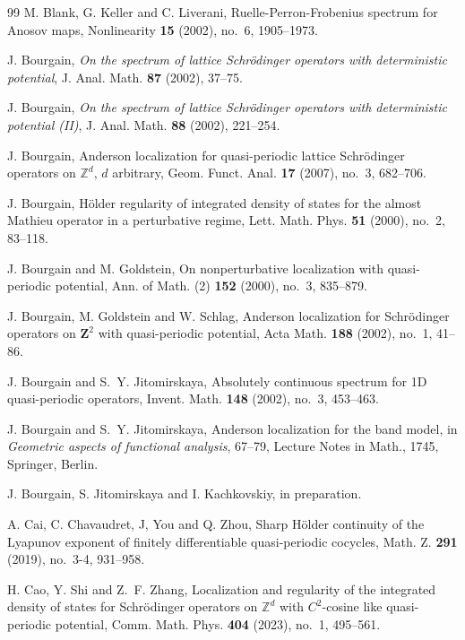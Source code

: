 \documentclass[reqno,11pt]{amsart}
\begin{document}
\begin{thebibliography}{99}
M. Blank, G. Keller and C. Liverani, Ruelle-Perron-Frobenius spectrum for Anosov maps, Nonlinearity {\bf 15} (2002), no.~6, 1905--1973.

J. Bourgain, 
\emph{On the spectrum of lattice Schr\"odinger operators with deterministic potential}, 
J. Anal. Math. \textbf{87} (2002), 37--75.

J. Bourgain, 
\emph{On the spectrum of lattice Schr\"odinger operators with deterministic potential (II)}, 
J. Anal. Math. \textbf{88} (2002), 221--254.

J. Bourgain, Anderson localization for quasi-periodic lattice Schr\"odinger operators on $\mathbb Z^d$, $d$ arbitrary, Geom. Funct. Anal. {\bf 17} (2007), no.~3, 682--706.

J. Bourgain, H\"older regularity of integrated density of states for the almost Mathieu operator in a perturbative regime, Lett. Math. Phys. {\bf 51} (2000), no.~2, 83--118.

J. Bourgain and M. Goldstein, On nonperturbative localization with quasi-periodic potential, Ann. of Math. (2) {\bf 152} (2000), no.~3, 835--879.


J. Bourgain, M. Goldstein and W. Schlag, Anderson localization for Schr\"odinger operators on $\mathbf Z^2$ with quasi-periodic potential, Acta Math. {\bf 188} (2002), no.~1, 41--86.


J. Bourgain and S.~Y. Jitomirskaya, Absolutely continuous spectrum for 1D quasi-periodic operators, Invent. Math. {\bf 148} (2002), no.~3, 453--463.


J. Bourgain and S.~Y. Jitomirskaya, Anderson localization for the band model, in {\it Geometric aspects of functional analysis}, 67--79, Lecture Notes in Math., 1745, Springer, Berlin.

J. Bourgain, S. Jitomirskaya and I. Kachkovskiy,  in preparation. 



A. Cai,  C. Chavaudret, J, You and Q. Zhou, Sharp H\"older continuity of the Lyapunov exponent of finitely differentiable quasi-periodic cocycles, Math. Z. {\bf 291} (2019), no.~3-4, 931--958.

 H. Cao, Y. Shi and Z.~F. Zhang, Localization and regularity of the integrated density of states for Schr\"odinger operators on $\mathbb Z^d$ with $C^2$-cosine like quasi-periodic potential, Comm. Math. Phys. {\bf 404} (2023), no.~1, 495--561.


\end{thebibliography}
\end{document}
